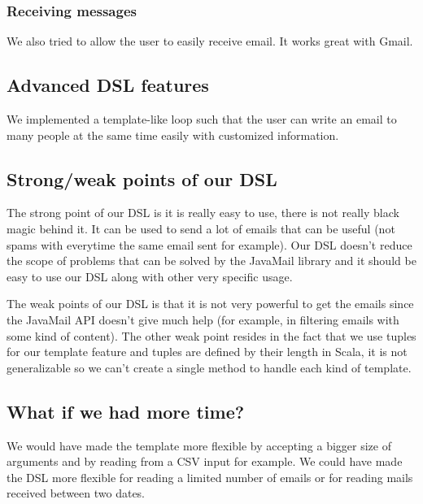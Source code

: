 \documentclass[a4paper, 11pt]{article}
\begin{document}
    

    \subsubsection{Receiving messages}

    We also tried to allow the user to easily receive email. It works great
    with Gmail.

    

    \subsection{Advanced DSL features}
    We implemented a template-like loop such that the user can write an
    email to many people at the same time easily with customized information.

    
    \subsection{Strong/weak points of our DSL}
    The strong point of our DSL is it is really easy to use, there is not really
    black magic behind it. It can be used to send a lot of emails that can
    be useful (not spams with everytime the same email sent for example). Our DSL
    doesn't reduce the scope of problems that can be solved by the JavaMail
    library and it should be easy to use our DSL along with other very specific
    usage. \newline

    The weak points of our DSL is that it is not very powerful to get the emails
    since the JavaMail API doesn't give much help (for example, in filtering
    emails with some kind of content). The other weak point resides in the fact
    that we use tuples for our template feature and tuples are defined by their
    length in Scala, it is not generalizable so we can't create a single method
    to handle each kind of template.

    \subsection{What if we had more time?}

    We would have made the template more flexible by accepting a bigger size of arguments
    and by reading from a CSV input for example. We could have made the DSL
    more flexible for reading a limited number of emails or for reading mails
    received between two dates. \newline
\end{document}
